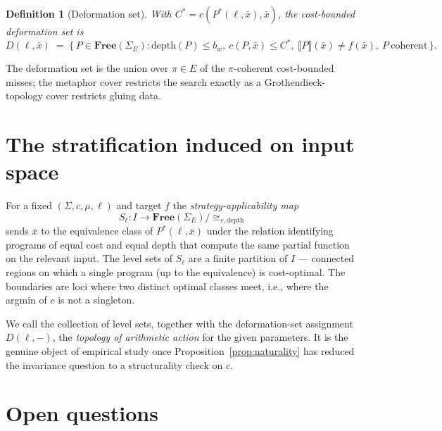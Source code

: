 \documentclass[11pt]{article}
\newtheorem{definition}{Definition}
\begin{document}
\begin{definition}[Deformation set]
With $C^* = c(P^*(\ell, \bar{x}), \bar{x})$, the
\emph{cost-bounded deformation set} is
\[
D(\ell, \bar{x}) \;=\; \Big\{\, P \in \mathbf{Free}(\Sigma_E) :
\mathrm{depth}(P) \le b_w,\ c(P, \bar{x}) \le C^*,\ \llbracket P
\rrbracket(\bar{x}) \ne f(\bar{x}),\ P\ \text{coherent}\,\Big\}.
\]
\end{definition}

The deformation set is the union over $\pi \in E$ of the
$\pi$-coherent cost-bounded misses; the metaphor cover restricts the
search exactly as a Grothendieck-topology cover restricts gluing data.

\section{The stratification induced on input space}\label{sec:topology}

For a fixed $(\Sigma, c, \mu, \ell)$ and target $f$ the
\emph{strategy-applicability map}
\[
S_\ell : I \longrightarrow \mathbf{Free}(\Sigma_E)\big/{\cong_{c, \mathrm{depth}}}
\]
sends $\bar{x}$ to the equivalence class of $P^*(\ell, \bar{x})$ under
the relation identifying programs of equal cost and equal depth that
compute the same partial function on the relevant input. The level
sets of $S_\ell$ are a finite partition of $I$ — connected regions on
which a single program (up to the equivalence) is cost-optimal. The
boundaries are loci where two distinct optimal classes meet, i.e.,
where the argmin of $c$ is not a singleton.

We call the collection of level sets, together with the
deformation-set assignment $D(\ell, -)$, the \emph{topology of
arithmetic action} for the given parameters. It is the genuine object
of empirical study once Proposition~\ref{prop:naturality} has reduced
the invariance question to a structurality check on $c$.

\section{Open questions}
\end{document}
